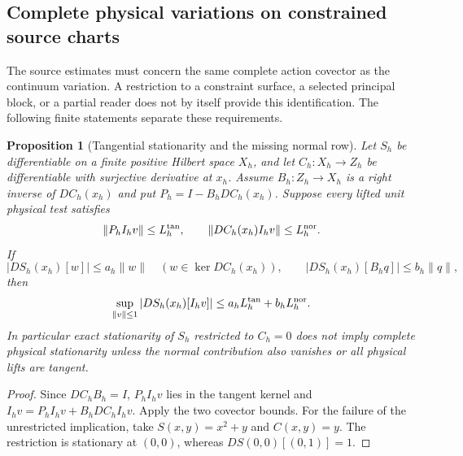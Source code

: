\documentclass[11pt]{article}
\numberwithin{equation}{section}
\newtheorem{proposition}[proposition]{Proposition}
\theoremstyle{definition}
\theoremstyle{remark}
\newcommand{\norm}[1]{\lVert#1\rVert}
\begin{document}
\subsection{Complete physical variations on constrained source charts}
\label{app:complete-source}

The source estimates must concern the same complete action covector as the
continuum variation.  A restriction to a constraint surface, a selected
principal block, or a partial reader does not by itself provide this
identification.  The following finite statements separate these requirements.

\begin{proposition}[Tangential stationarity and the missing normal row]
\label{prop:normal-source}
Let $S_h$ be differentiable on a finite positive Hilbert space $X_h$, and let
$C_h:X_h\to Z_h$ be differentiable with surjective derivative at $x_h$.
Assume $B_h:Z_h\to X_h$ is a right inverse of $DC_h(x_h)$ and put
$P_h=I-B_hDC_h(x_h)$.  Suppose every lifted unit physical test satisfies
\[
 \norm{P_hI_hv}\le L_h^{\rm tan},\qquad
 \norm{DC_h(x_h)I_hv}\le L_h^{\rm nor}.
\]
If
\[
 |DS_h(x_h)[w]|\le a_h\norm w\quad(w\in\ker DC_h(x_h)),
 \qquad
 |DS_h(x_h)[B_hq]|\le b_h\norm q,
\]
then
\begin{equation}
 \sup_{\norm v\le1}|DS_h(x_h)[I_hv]|
 \le a_hL_h^{\rm tan}+b_hL_h^{\rm nor}.
 \label{eq:normal-source-bound}
\end{equation}
In particular exact stationarity of $S_h$ restricted to $C_h=0$ does not
imply complete physical stationarity unless the normal contribution also
vanishes or all physical lifts are tangent.
\end{proposition}
\begin{proof}
Since $DC_hB_h=I$, $P_hI_hv$ lies in the tangent kernel and
$I_hv=P_hI_hv+B_hDC_hI_hv$.  Apply the two covector bounds.
For the failure of the unrestricted implication, take
$S(x,y)=x^2+y$ and $C(x,y)=y$.  The restriction is stationary at $(0,0)$,
whereas $DS(0,0)[(0,1)]=1$.
\end{proof}
\end{document}
